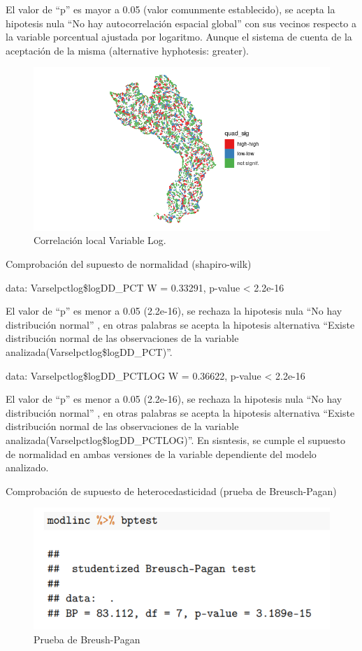 \documentclass[11pt,]{article}
\begin{document}
El valor de ``p'' es mayor a 0.05 (valor comunmente establecido), se
acepta la hipotesis nula ``No hay autocorrelación espacial global'' con
sus vecinos respecto a la variable porcentual ajustada por logaritmo.
Aunque el sistema de cuenta de la aceptación de la misma (alternative
hyphotesis: greater).

\begin{figure}
\centering
\includegraphics{Imagenes/autesplocal.png}
\caption{Correlación local Variable Log.}
\end{figure}

Comprobación del supuesto de normalidad (shapiro-wilk)

data: Varselpctlog\$logDD\_PCT W = 0.33291, p-value \textless{} 2.2e-16

El valor de ``p'' es menor a 0.05 (2.2e-16), se rechaza la hipotesis
nula ``No hay distribución normal'' , en otras palabras se acepta la
hipotesis alternativa ``Existe distribución normal de las observaciones
de la variable analizada(Varselpctlog\$logDD\_PCT)''.

data: Varselpctlog\$logDD\_PCTLOG W = 0.36622, p-value \textless{}
2.2e-16

El valor de ``p'' es menor a 0.05 (2.2e-16), se rechaza la hipotesis
nula ``No hay distribución normal'' , en otras palabras se acepta la
hipotesis alternativa ``Existe distribución normal de las observaciones
de la variable analizada(Varselpctlog\$logDD\_PCTLOG)''. En sisntesis,
se cumple el supuesto de normalidad en ambas versiones de la variable
dependiente del modelo analizado.

Comprobación de supuesto de heterocedasticidad (prueba de Breusch-Pagan)

\begin{figure}
\centering
\includegraphics{Imagenes/breuschPagan.png}
\caption{Prueba de Breush-Pagan}
\end{figure}
\end{document}
